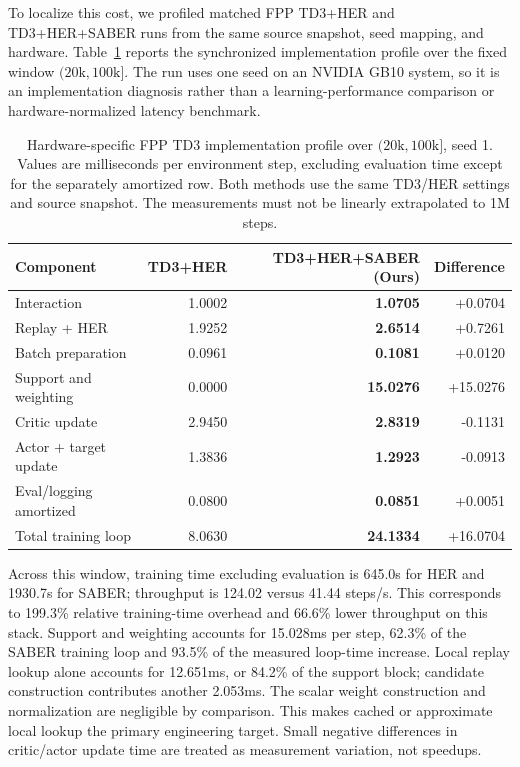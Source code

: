 \documentclass[letterpaper]{article}
\newcommand{\ours}[1]{\textbf{#1 (Ours)}}
\newcommand{\ourscell}[1]{\textbf{#1}}
\begin{document}
To localize this cost, we profiled matched FPP TD3+HER and TD3+HER+SABER runs from the same source snapshot, seed mapping, and hardware. Table~\ref{tab:runtime-breakdown} reports the synchronized implementation profile over the fixed window \((20\mathrm{k},100\mathrm{k}]\). The run uses one seed on an NVIDIA GB10 system, so it is an implementation diagnosis rather than a learning-performance comparison or hardware-normalized latency benchmark.

\begin{table}[t]
\centering
\caption{Hardware-specific FPP TD3 implementation profile over \((20\mathrm{k},100\mathrm{k}]\), seed 1. Values are milliseconds per environment step, excluding evaluation time except for the separately amortized row. Both methods use the same TD3/HER settings and source snapshot. The measurements must not be linearly extrapolated to 1M steps.}
\label{tab:runtime-breakdown}
\begin{tabular}{lrrr}
\toprule
Component & TD3+HER & \ours{TD3+HER+SABER} & Difference \\
\midrule
Interaction & 1.0002 & \ourscell{1.0705} & +0.0704 \\
Replay + HER & 1.9252 & \ourscell{2.6514} & +0.7261 \\
Batch preparation & 0.0961 & \ourscell{0.1081} & +0.0120 \\
Support and weighting & 0.0000 & \ourscell{15.0276} & +15.0276 \\
Critic update & 2.9450 & \ourscell{2.8319} & -0.1131 \\
Actor + target update & 1.3836 & \ourscell{1.2923} & -0.0913 \\
Eval/logging amortized & 0.0800 & \ourscell{0.0851} & +0.0051 \\
Total training loop & 8.0630 & \ourscell{24.1334} & +16.0704 \\
\bottomrule
\end{tabular}
\end{table}

Across this window, training time excluding evaluation is 645.0s for HER and 1930.7s for SABER; throughput is 124.02 versus 41.44 steps/s. This corresponds to 199.3\% relative training-time overhead and 66.6\% lower throughput on this stack. Support and weighting accounts for 15.028ms per step, 62.3\% of the SABER training loop and 93.5\% of the measured loop-time increase. Local replay lookup alone accounts for 12.651ms, or 84.2\% of the support block; candidate construction contributes another 2.053ms. The scalar weight construction and normalization are negligible by comparison. This makes cached or approximate local lookup the primary engineering target. Small negative differences in critic/actor update time are treated as measurement variation, not speedups.
\end{document}
